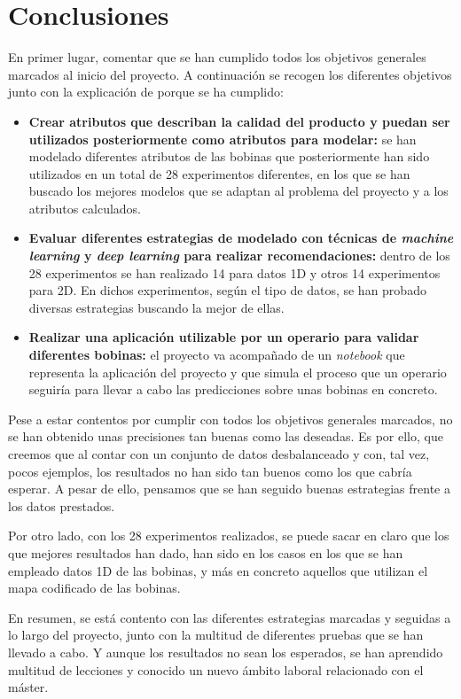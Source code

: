 
\section{Conclusiones}
En primer lugar, comentar que se han cumplido todos los objetivos generales marcados al inicio del proyecto. A continuación se recogen los diferentes objetivos junto con la explicación de porque se ha cumplido:
\begin{itemize}
    \item \textbf{Crear atributos que describan la calidad del producto y puedan ser utilizados posteriormente como atributos para modelar:} se han modelado diferentes atributos de las bobinas que posteriormente han sido utilizados en un total de 28 experimentos diferentes, en los que se han buscado los mejores modelos que se adaptan al problema del proyecto y a los atributos calculados.
    \item \textbf{Evaluar diferentes estrategias de modelado con técnicas de \emph{machine learning} y \emph{deep learning} para realizar recomendaciones:} dentro de los 28 experimentos se han realizado 14 para datos 1D y otros 14 experimentos para 2D. En dichos experimentos, según el tipo de datos, se han probado diversas estrategias buscando la mejor de ellas.
    \item \textbf{Realizar una aplicación utilizable por un operario para validar diferentes bobinas:} el proyecto va acompañado de un \emph{notebook} que representa la aplicación del proyecto y que simula el proceso que un operario seguiría para llevar a cabo las predicciones sobre unas bobinas en concreto.
\end{itemize}

Pese a estar contentos por cumplir con todos los objetivos generales marcados, no se han obtenido unas precisiones tan buenas como las deseadas. Es por ello, que creemos que al contar con un conjunto de datos desbalanceado y con, tal vez, pocos ejemplos, los resultados no han sido tan buenos como los que cabría esperar. A pesar de ello, pensamos que se han seguido buenas estrategias frente a los datos prestados.

Por otro lado, con los 28 experimentos realizados, se puede sacar en claro que los que mejores resultados han dado, han sido en los casos en los que se han empleado datos 1D de las bobinas, y más en concreto aquellos que utilizan el mapa codificado de las bobinas.

En resumen, se está contento con las diferentes estrategias marcadas y seguidas a lo largo del proyecto, junto con la multitud de diferentes pruebas que se han llevado a cabo. Y aunque los resultados no sean los esperados, se han aprendido multitud de lecciones y conocido un nuevo ámbito laboral relacionado con el máster. 

